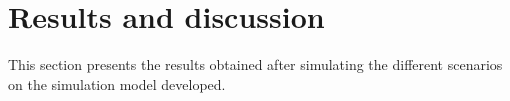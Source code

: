 \section{Results and discussion}

This section presents the results obtained after simulating the different scenarios on the simulation model developed.  
